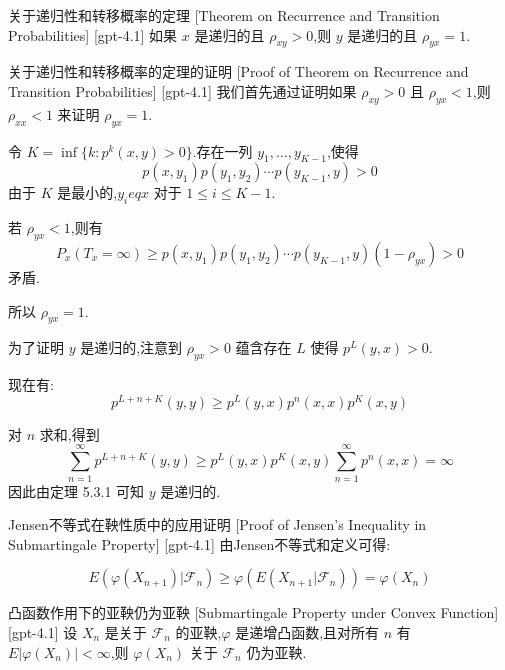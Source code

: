 \documentclass[UTF8]{ctexart}
\begin{document}
    
    
    \begin{thm}
        {关于递归性和转移概率的定理}
        [Theorem on Recurrence and Transition Probabilities]
        [gpt-4.1]
        如果 $x$ 是递归的且 $\rho_{xy} > 0$,则 $y$ 是递归的且 $\rho_{yx} = 1$.
    \end{thm}
    
    
    
    \begin{prf}
        {关于递归性和转移概率的定理的证明}
        [Proof of Theorem on Recurrence and Transition Probabilities]
        [gpt-4.1]
        我们首先通过证明如果 $\rho_{xy} > 0$ 且 $\rho_{yx} < 1$,则 $\rho_{xx} < 1$ 来证明 $\rho_{yx} = 1$.

令 $K = \operatorname{inf} \{ k : p^{k}(x, y) > 0 \}$.存在一列 $y_1, \ldots, y_{K-1}$,使得
\[
p(x, y_1) p(y_1, y_2) \cdots p(y_{K-1}, y) > 0
\]
由于 $K$ 是最小的,$y_i 
eq x$ 对于 $1 \leq i \leq K-1$.

若 $\rho_{yx} < 1$,则有
\[
P_x(T_x = \infty) \geq p(x, y_1) p(y_1, y_2) \cdots p(y_{K-1}, y) (1 - \rho_{yx}) > 0
\]
矛盾.

所以 $\rho_{yx} = 1$.

为了证明 $y$ 是递归的,注意到 $\rho_{yx} > 0$ 蕴含存在 $L$ 使得 $p^{L}(y, x) > 0$.

现在有:
\[
p^{L+n+K}(y, y) \geq p^{L}(y, x) p^{n}(x, x) p^{K}(x, y)
\]

对 $n$ 求和,得到
\[
\sum_{n=1}^{\infty} p^{L+n+K}(y, y) \geq p^{L}(y, x) p^{K}(x, y) \sum_{n=1}^{\infty} p^{n}(x, x) = \infty
\]
因此由定理 5.3.1 可知 $y$ 是递归的.
    \end{prf}
    
    
    
    \begin{prf}
        {Jensen不等式在鞅性质中的应用证明}
        [Proof of Jensen's Inequality in Submartingale Property]
        [gpt-4.1]
        由Jensen不等式和定义可得:

\[
E ( \varphi ( X_{n+1} ) | \mathcal{F}_n ) \geq \varphi ( E ( X_{n+1} | \mathcal{F}_n ) ) = \varphi ( X_n )
\]

    \end{prf}
    
    
    
    \begin{thm}
        {凸函数作用下的亚鞅仍为亚鞅}
        [Submartingale Property under Convex Function]
        [gpt-4.1]
        设 $X_n$ 是关于 $\mathcal{F}_n$ 的亚鞅,$\varphi$ 是递增凸函数,且对所有 $n$ 有 $E | \varphi ( X_n ) | < \infty$,则 $\varphi ( X_n )$ 关于 $\mathcal{F}_n$ 仍为亚鞅.

    \end{thm}
    
\end{document}
